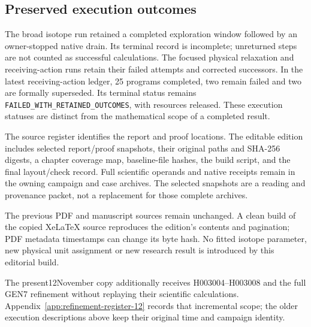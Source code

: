\subsection{Preserved execution outcomes}

The broad isotope run retained a completed exploration window followed by
an owner-stopped native drain. Its terminal record is incomplete; unreturned
steps are not counted as successful calculations. The focused physical
relaxation and receiving-action runs retain their failed attempts and
corrected successors. In the latest receiving-action ledger, 25 programs
completed, two remain failed and two are formally superseded. Its terminal
status remains \texttt{FAILED\_WITH\_RETAINED\_OUTCOMES}, with resources
released. These execution statuses are distinct from the mathematical
scope of a completed result.

The source register identifies the report and proof locations. The editable
edition includes selected report/proof snapshots, their original paths and
SHA-256 digests, a chapter coverage map, baseline-file hashes, the build
script, and the final layout/check record. Full scientific operands and
native receipts remain in the owning campaign and case archives. The
selected snapshots are a reading and provenance packet, not a replacement
for those complete archives.

The previous PDF and manuscript sources remain unchanged. A clean build
of the copied XeLaTeX source reproduces the edition's contents and
pagination; PDF metadata timestamps can change its byte hash. No fitted
isotope parameter, new physical unit assignment or new research result is
introduced by this editorial build.

The present12November copy additionally receives H003004--H003008 and
the full GEN7 refinement without replaying their scientific calculations.
Appendix~\ref{app:refinement-register-12} records that incremental scope;
the older execution descriptions above keep their original time and
campaign identity.
